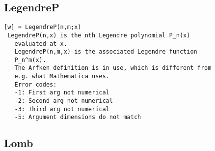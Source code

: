 \documentclass[a4paper]{article}
\begin{document}
\subsection{LegendreP\label{LegendreP}}

\begin{tscreen}
\begin{verbatim}
[w] = LegendreP(n,m;x)
 LegendreP(n,x) is the nth Legendre polynomial P_n(x)
   evaluated at x.
   LegendreP(n,m,x) is the associated Legendre function
   P_n^m(x).
   The Arfken definition is in use, which is different from
   e.g. what Mathematica uses.
   Error codes:
   -1: First arg not numerical
   -2: Second arg not numerical
   -3: Third arg not numerical
   -5: Argument dimensions do not match
\end{verbatim}
\end{tscreen}





\subsection{Lomb\label{Lomb}}
\end{document}
